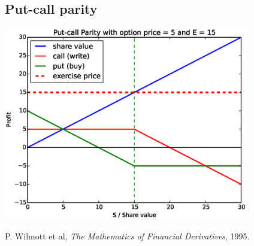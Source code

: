 \documentclass[8 pt]{article}
\newenvironment{Figure}
  {\par\medskip\noindent\minipage{\linewidth}}
  {\endminipage\par\medskip}
\begin{document}
\begin{multicols*}{2}
\section{Put-call parity}

\begin{Figure}
  \begin{center}
    \includegraphics[width=0.8\textwidth]{graphs/put_call_parity.eps}
    \label{fig:put_call_parity}
  \end{center}
\end{Figure}

\end{multicols*}

\begin{thebibliography}{28}
\raggedright
{}

 P. Wilmott et al, \emph{The Mathematics of Financial Derivatives}, 1995.

\end{thebibliography}
\end{document}
